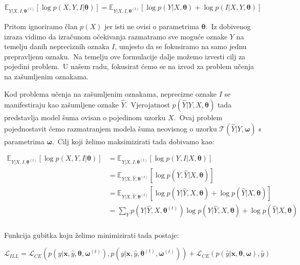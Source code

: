 \documentclass[diplomskirad]{fer}
\begin{document}
\begin{equation}
  \mathbb{E}_{Y | X, I, \bm{\theta}^{(t)}} \left[ \log p(X, Y, I | \bm{\theta}) \right] = \mathbb{E}_{Y | X, I, \bm{\theta}^{(t)}} \left[ \log p(Y | X, \bm{\theta}) + \log p(I | X, Y, \bm{\theta}) \right]
  \label{eq:ill_expectation}
\end{equation}

\pagebreak

Pritom ignoriramo član $p(X)$ jer isti ne ovisi o parametrima $\bm{\theta}$.\ Iz dobivenog izraza vidimo da izračunom očekivanja razmatramo sve moguće oznake $Y$ na temelju danih nepreciznih oznaka $I$, umjesto da se fokusiramo na samo jednu prepravljenu oznaku.\
Na temelju ove formulacije dalje možemo izvesti cilj za pojedini problem.\ U našem radu, fokusirat ćemo se na izvod za problem učenja na zašumljenim oznakama.\ 

Kod problema učenja na zašumljenim oznakama, neprecizne oznake $I$ se manifestiraju kao zašumljene oznake $\hat{Y}$.\ 
Vjerojatnost $p(\hat{Y} | Y, X, \bm{\theta})$ tada predstavlja model šuma ovisan o pojedinom uzorku $X$.\ 
Ovaj problem pojednostavit ćemo razmatranjem modela šuma neovisnog o uzorku $\mathcal{T}(\hat{Y} | Y, \bm{\omega})$ s parametrima $\bm{\omega}$.\ Cilj koji želimo maksimizirati tada dobivamo kao:

\begin{equation}
  \begin{aligned}
    \mathbb{E}_{Y | X, I, \bm{\theta}^{(t)}} \left[ \log p(X, Y, I | \bm{\theta}) \right] &= \mathbb{E}_{Y | X, I, \bm{\theta}^{(t)}} \left[ \log p(Y, I | X, \bm{\theta}) \right] \\
    &= \mathbb{E}_{Y | X, \hat{Y}, \bm{\theta}^{(t)}} \left[ \log p(Y, \hat{Y} | X, \bm{\theta}) \right] \\
    &= \mathbb{E}_{Y | X, \hat{Y}, \bm{\theta}^{(t)}} \left[ \log p(Y | \hat{Y}, X, \bm{\theta}) + \log p(\hat{Y} | X, \bm{\theta}) \right] \\
    &= \sum_{Y} p(Y | \hat{Y}, X, \bm{\theta}^{(t)}) \log p(Y | \hat{Y}, X, \bm{\theta}) + \log p(\hat{Y} | X, \bm{\theta}) \\
  \end{aligned}
  \label{eq:ill_target}
\end{equation}

Funkcija gubitka koju želimo minimizirati tada postaje:

\begin{equation}
  \mathcal{L}_{ILL} = \mathcal{L}_{CE} (p(y | \bm{x}, \hat{y}, \bm{\theta}, \bm{\omega}^{(t)}), p(y | \bm{x}, \hat{y}, \bm{\theta}^{(t)}, \bm{\omega}^{(t)})) + \mathcal{L}_{CE} (p(\hat{y} | \bm{x}, \bm{\theta}, \bm{\omega}), \hat{y})
  \label{eq:ill_loss}
\end{equation}
\end{document}
